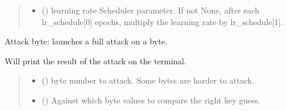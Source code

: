 \documentclass[letterpaper,10pt,english]{sphinxmanual}
\begin{document}
\begin{fulllineitems}
\begin{fulllineitems}
\begin{quote}
\begin{description}
\begin{itemize}
\item {} 
\sphinxAtStartPar
{} (\sphinxstyleliteralemphasis{\sphinxupquote{{[}}}\sphinxstyleliteralemphasis{\sphinxupquote{,}}\sphinxstyleliteralemphasis{\sphinxupquote{{]} }}\sphinxstyleliteralemphasis{\sphinxupquote{| }}) \textendash{} learning rate Scheduler parameter. If not None, after each lr\_schedule{[}0{]} epochs,
multiply the learning rate by lr\_schedule{[}1{]}.

\end{itemize}

\end{description}\end{quote}

\end{fulllineitems}


\begin{fulllineitems}
\label{\detokenize{MLSCAlib.Attacks:MLSCAlib.Attacks.unprofiled.UnProfiled.attack_byte}}
\pysigstartsignatures
{}
\pysigstopsignatures
\sphinxAtStartPar
Attack byte: launches a full attack on a byte.

\sphinxAtStartPar
Will print the result of the attack on the terminal.
\begin{quote}\begin{description}
\begin{itemize}
\item {} 
\sphinxAtStartPar
{} () \textendash{} byte number to attack. Some bytes are harder to attack.

\item {} 
\sphinxAtStartPar
{} (\sphinxstyleliteralemphasis{\sphinxupquote{, }}\sphinxstyleliteralemphasis{\sphinxupquote{(}}\sphinxstyleliteralemphasis{\sphinxupquote{)}}) \textendash{} Against which byte values to compare the right key guess.


\end{itemize}
\end{description}
\end{quote}
\end{fulllineitems}
\end{fulllineitems}
\end{document}
